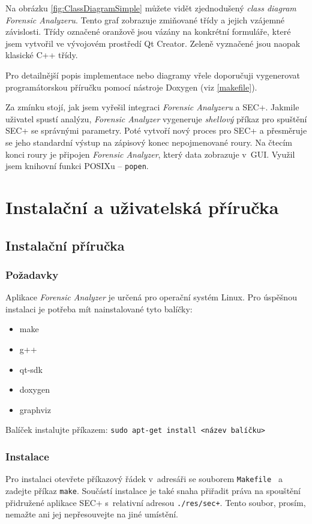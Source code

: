 \documentclass[thesis=B,czech]{FITthesis}[2012/06/26]
\begin{document}
Na obrázku \ref{fig:ClassDiagramSimple} můžete vidět zjednodušený \textit{class diagram} \textit{Forensic Analyzeru}. Tento graf zobrazuje zmiňované třídy a jejich vzájemné závislosti. Třídy označené oranžově jsou vázány na konkrétní formuláře, které jsem vytvořil ve vývojovém prostředí Qt Creator. Zeleně vyznačené jsou naopak klasické C++ třídy. 

Pro detailnější popis implementace nebo diagramy vřele doporučuji vygenerovat programátorskou příručku pomocí nástroje Doxygen (viz \ref{makefile}).

Za zmínku stojí, jak jsem vyřešil integraci \textit{Forensic Analyzeru} a SEC+. Jakmile uživatel spustí analýzu, \textit{Forensic Analyzer} vygeneruje \textit{shellový} příkaz pro spuštění SEC+ se správnými parametry. Poté vytvoří nový proces pro SEC+ a přesměruje se jeho standardní výstup na zápisový konec nepojmenované roury. Na čtecím konci roury je připojen \textit{Forensic Analyzer}, který data zobrazuje v~GUI. Využil jsem knihovní funkci POSIXu -- \texttt{popen}. \cite{popen}

\chapter{Instalační a uživatelská příručka}
%
\section{Instalační příručka}
\subsection{Požadavky}
Aplikace \textit{Forensic Analyzer} je určená pro operační systém Linux. Pro úspěšnou instalaci je potřeba mít nainstalované tyto balíčky:
\begin{itemize}
	\item make
	\item g++
	\item qt-sdk
	\item doxygen
	\item graphviz
\end{itemize}

Balíček instalujte příkazem: \texttt{sudo apt-get install <název balíčku>}

\subsection{Instalace}
Pro instalaci otevřete příkazový řádek v~adresáři se souborem \texttt{Makefile } a zadejte příkaz \texttt{make}.
Součástí instalace je také snaha přiřadit práva na spouštění přidružené aplikace SEC+ s~relativní adresou \texttt{./res/sec+}. Tento soubor, prosím, nemažte ani jej nepřesouvejte na jiné umístění.
\end{document}
